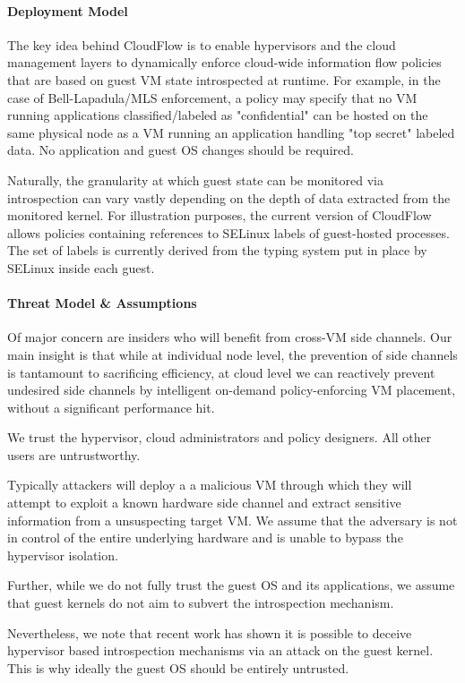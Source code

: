 \paragraph{\bf Deployment Model}
% 
The key idea behind CloudFlow is to enable hypervisors and the cloud
management layers to dynamically enforce cloud-wide information flow
policies that are based on guest VM state introspected at runtime.  For
example, in the case of Bell-Lapadula/MLS enforcement, a policy may specify
that no VM running applications classified/labeled as "confidential" can be hosted
on the same physical node as a VM running an application handling "top
secret" labeled data. No application and guest OS changes should be required. 

Naturally, the granularity at which guest state can be monitored via
introspection can vary vastly depending on the depth of data extracted from
the monitored kernel.  For illustration purposes, the current version of
CloudFlow allows policies containing references to SELinux labels of
guest-hosted processes.  The set of labels is currently derived from the
typing system put in place by SELinux inside each guest.

\paragraph{\bf Threat Model \& Assumptions}
% 
Of major concern are insiders who will benefit from cross-VM side channels.
Our main insight is that while at individual node level, the prevention
of side channels is tantamount to sacrificing efficiency, at cloud level we
can reactively prevent undesired side channels by intelligent on-demand
policy-enforcing VM placement, without a significant performance hit.

We trust the hypervisor, cloud administrators and policy designers. All
other users are untrustworthy.

Typically attackers will deploy a a malicious VM through which they will
attempt to exploit a known hardware side channel and extract sensitive
information from a unsuspecting target VM.  We assume that the adversary is
not in control of the entire underlying hardware and is unable to
bypass the hypervisor isolation.

Further, while we do not fully trust the guest OS and its applications, we
assume that guest kernels do not aim to subvert the introspection mechanism. 

Nevertheless, we note that recent work \cite{DKSM} has shown it is possible to deceive hypervisor
based introspection mechanisms via an attack on the guest kernel. This is
why ideally the guest OS should be entirely untrusted.

